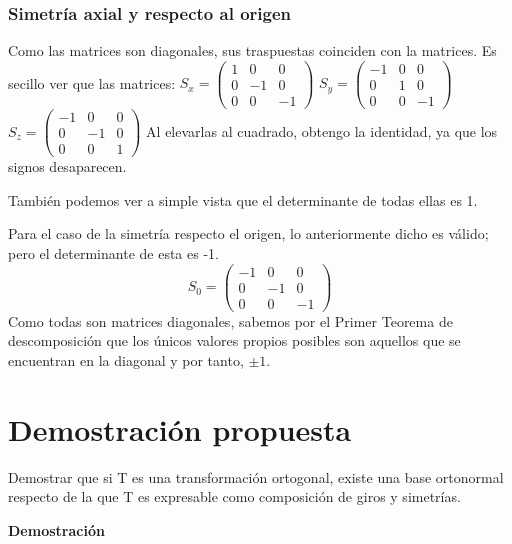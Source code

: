 \documentclass [a4paper,12pt]{article}
\begin{document}
\subsubsection{Simetría axial y respecto al origen}
Como las matrices son diagonales, sus traspuestas coinciden con la matrices.
Es secillo ver que las matrices: 
$
S_x=\begin{pmatrix}
1&0 &0\\
0&-1&0\\
0&0&-1
\end{pmatrix}
$
$
S_y=\begin{pmatrix}
-1&0 &0\\
0&1&0\\
0&0&-1
\end{pmatrix}
$
$
S_z=\begin{pmatrix}
-1&0 &0\\
0&-1&0\\
0&0&1
\end{pmatrix}
$
Al elevarlas al cuadrado, obtengo la identidad, ya que los signos desaparecen.\par
También podemos ver a simple vista que el determinante de todas ellas es 1.\par
Para el caso de la simetría respecto el origen, lo anteriormente dicho es válido; pero el determinante de esta es -1.
$$
S_0=\begin{pmatrix}
-1&0 &0\\
0&-1&0\\
0&0&-1
\end{pmatrix}
$$
Como todas son matrices diagonales, sabemos por el Primer Teorema de descomposición que los únicos valores propios posibles son aquellos que se encuentran en la diagonal y por tanto, $\pm1$.
\section{Demostración propuesta}
Demostrar que si T es una transformación ortogonal, existe una base ortonormal respecto de la que T es expresable como composición de giros y simetrías.	\par

\textbf{Demostración}
\end{document}
